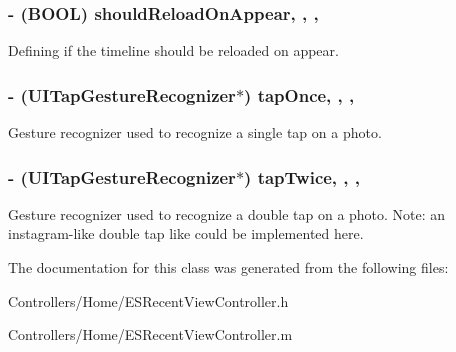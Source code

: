 \subsubsection[{should\+Reload\+On\+Appear}]{\setlength{\rightskip}{0pt plus 5cm}-\/ (B\+O\+O\+L) should\+Reload\+On\+Appear\hspace{0.3cm}{\ttfamily [read]}, {\ttfamily [write]}, {\ttfamily [nonatomic]}, {\ttfamily [assign]}}\label{interface_e_s_recent_view_controller_a5c126b4f30492fb53e2129f72b72d45a}
Defining if the timeline should be reloaded on appear. \hypertarget{interface_e_s_recent_view_controller_a1058bd1b0a7d3c0eff171ac690d96533}{}
\subsubsection[{tap\+Once}]{\setlength{\rightskip}{0pt plus 5cm}-\/ (U\+I\+Tap\+Gesture\+Recognizer$\ast$) tap\+Once\hspace{0.3cm}{\ttfamily [read]}, {\ttfamily [write]}, {\ttfamily [nonatomic]}, {\ttfamily [strong]}}\label{interface_e_s_recent_view_controller_a1058bd1b0a7d3c0eff171ac690d96533}
Gesture recognizer used to recognize a single tap on a photo. \hypertarget{interface_e_s_recent_view_controller_a9556191a79dab1b626512227348cbf5c}{}
\subsubsection[{tap\+Twice}]{\setlength{\rightskip}{0pt plus 5cm}-\/ (U\+I\+Tap\+Gesture\+Recognizer$\ast$) tap\+Twice\hspace{0.3cm}{\ttfamily [read]}, {\ttfamily [write]}, {\ttfamily [nonatomic]}, {\ttfamily [strong]}}\label{interface_e_s_recent_view_controller_a9556191a79dab1b626512227348cbf5c}
Gesture recognizer used to recognize a double tap on a photo. Note\+: an instagram-\/like double tap like could be implemented here. 

The documentation for this class was generated from the following files\+:\begin{DoxyCompactItemize}
\item 
Controllers/\+Home/E\+S\+Recent\+View\+Controller.\+h\item 
Controllers/\+Home/E\+S\+Recent\+View\+Controller.\+m\end{DoxyCompactItemize}
